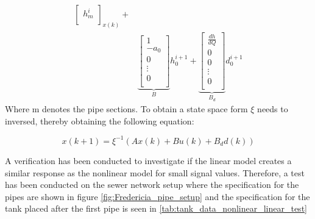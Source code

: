 \begin{equation}
\begin{aligned}
{\begin{bmatrix}
		h_{m}^{i}\\
		\end{bmatrix}}_{x(k)}
	+ \\ & \underbrace{\begin{bmatrix}
		 1\\
		 -a_0 \\
		 0\\
		 \vdots \\
		 0\\
		\end{bmatrix}}_{B}
		h_0^{i+1}
		+ 
		\underbrace{\begin{bmatrix}
		 \frac{dh}{dQ}\\
		 0 \\
		 0\\
		 \vdots \\
		 0\\
		\end{bmatrix}}_{B_d}
		d_{0}^{i+1}
	\end{aligned}
\end{equation}
Where m denotes the pipe sections.  
To obtain a state space form $\xi$ needs to inversed, thereby obtaining the following equation:

\begin{equation}
	x(k+1) = \xi^{-1} (Ax(k)+Bu(k)+B_dd(k))
\end{equation}





A verification has been conducted to investigate if the linear model creates a similar response as the nonlinear model for small signal values. Therefore, a test has been conducted on the sewer network setup where the specification for the pipes are shown in figure \ref{fig:Fredericia_pipe_setup} and the specification for the tank placed after the first pipe is seen in \ref{tab:tank_data_nonlinear_linear_test} 

